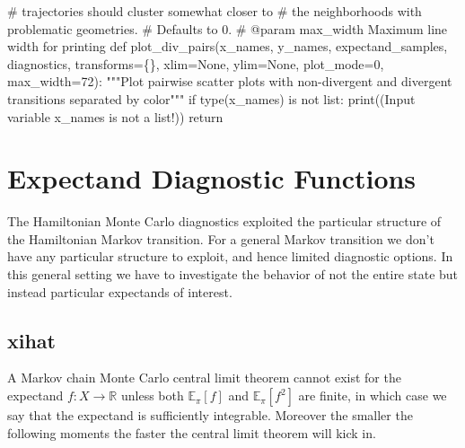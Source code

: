 \documentclass[
  letterpaper,
  DIV=11,
  numbers=noendperiod]{scrartcl}
\newenvironment{Shaded}{\begin{snugshade}}{\end{snugshade}}
\newcommand{\BuiltInTok}[1]{\textcolor[rgb]{0.00,0.23,0.31}{#1}}
\newcommand{\CommentTok}[1]{\textcolor[rgb]{0.37,0.37,0.37}{#1}}
\newcommand{\ControlFlowTok}[1]{\textcolor[rgb]{0.00,0.23,0.31}{#1}}
\newcommand{\DecValTok}[1]{\textcolor[rgb]{0.68,0.00,0.00}{#1}}
\newcommand{\KeywordTok}[1]{\textcolor[rgb]{0.00,0.23,0.31}{#1}}
\newcommand{\NormalTok}[1]{\textcolor[rgb]{0.00,0.23,0.31}{#1}}
\newcommand{\OperatorTok}[1]{\textcolor[rgb]{0.37,0.37,0.37}{#1}}
\newcommand{\StringTok}[1]{\textcolor[rgb]{0.13,0.47,0.30}{#1}}
\newcommand{\VariableTok}[1]{\textcolor[rgb]{0.07,0.07,0.07}{#1}}
\begin{document}
\begin{Shaded}
\begin{Highlighting}[]
\CommentTok{\#                        trajectories should cluster somewhat closer to }
\CommentTok{\#                        the neighborhoods with problematic geometries.}
\CommentTok{\#                   Defaults to 0.}
\CommentTok{\# @param max\_width Maximum line width for printing}
\KeywordTok{def}\NormalTok{ plot\_div\_pairs(x\_names, y\_names, expectand\_samples, }
\NormalTok{                   diagnostics, transforms}\OperatorTok{=}\NormalTok{\{\},}
\NormalTok{                   xlim}\OperatorTok{=}\VariableTok{None}\NormalTok{, ylim}\OperatorTok{=}\VariableTok{None}\NormalTok{, }
\NormalTok{                   plot\_mode}\OperatorTok{=}\DecValTok{0}\NormalTok{, max\_width}\OperatorTok{=}\DecValTok{72}\NormalTok{):}
  \CommentTok{"""Plot pairwise scatter plots with non{-}divergent and divergent }
\CommentTok{     transitions separated by color"""}
  \ControlFlowTok{if} \BuiltInTok{type}\NormalTok{(x\_names) }\KeywordTok{is} \KeywordTok{not} \BuiltInTok{list}\NormalTok{:}
    \BuiltInTok{print}\NormalTok{((}\StringTok{\textquotesingle{}Input variable \textasciigrave{}x\_names\textasciigrave{} is not a list!\textquotesingle{}}\NormalTok{))}
    \ControlFlowTok{return}
\end{Highlighting}
\end{Shaded}

\hypertarget{expectand-diagnostic-functions}{%
\section{Expectand Diagnostic
Functions}\label{expectand-diagnostic-functions}}

The Hamiltonian Monte Carlo diagnostics exploited the particular
structure of the Hamiltonian Markov transition. For a general Markov
transition we don't have any particular structure to exploit, and hence
limited diagnostic options. In this general setting we have to
investigate the behavior of not the entire state but instead particular
expectands of interest.

\hypertarget{xihat}{%
\subsection{xihat}\label{xihat}}

A Markov chain Monte Carlo central limit theorem cannot exist for the
expectand \(f : X \rightarrow \mathbb{R}\) unless both
\(\mathbb{E}_{\pi}[f]\) and \(\mathbb{E}_{\pi}[f^{2}]\) are finite, in
which case we say that the expectand is sufficiently integrable.
Moreover the smaller the following moments the faster the central limit
theorem will kick in.
\end{document}
